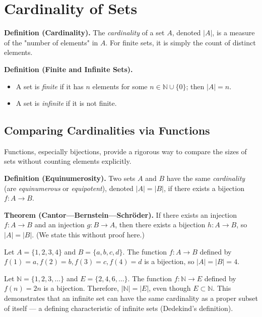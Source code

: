 \documentclass[11pt,a4paper]{article}
\begin{document}
\section{Cardinality of Sets}

\textbf{Definition (Cardinality).} The \textit{cardinality} of a set $A$, denoted $|A|$, is a measure of the "number of elements" in $A$. For finite sets, it is simply the count of distinct elements.

\textbf{Definition (Finite and Infinite Sets).}
\begin{itemize}
    \item A set is \textit{finite} if it has $n$ elements for some $n \in \mathbb{N} \cup \{0\}$; then $|A| = n$.
    \item A set is \textit{infinite} if it is not finite.
\end{itemize}

\subsection{Comparing Cardinalities via Functions}

Functions, especially bijections, provide a rigorous way to compare the sizes of sets without counting elements explicitly.

\textbf{Definition (Equinumerosity).} Two sets $A$ and $B$ have the same \textit{cardinality} (are \textit{equinumerous} or \textit{equipotent}), denoted $|A| = |B|$, if there exists a bijection $f: A \to B$.

\textbf{Theorem (Cantor—Bernstein—Schröder).} If there exists an injection $f: A \to B$ and an injection $g: B \to A$, then there exists a bijection $h: A \to B$, so $|A| = |B|$. (We state this without proof here.)

\begin{example}
Let $A = \{1, 2, 3, 4\}$ and $B = \{a, b, c, d\}$. The function $f: A \to B$ defined by $f(1)=a, f(2)=b, f(3)=c, f(4)=d$ is a bijection, so $|A| = |B| = 4$.
\end{example}

\begin{example}
Let $\mathbb{N} = \{1, 2, 3, \dots\}$ and $E = \{2, 4, 6, \dots\}$. The function $f: \mathbb{N} \to E$ defined by $f(n) = 2n$ is a bijection. Therefore, $|\mathbb{N}| = |E|$, even though $E \subset \mathbb{N}$. This demonstrates that an infinite set can have the same cardinality as a proper subset of itself — a defining characteristic of infinite sets (Dedekind's definition).
\end{example}
\end{document}
